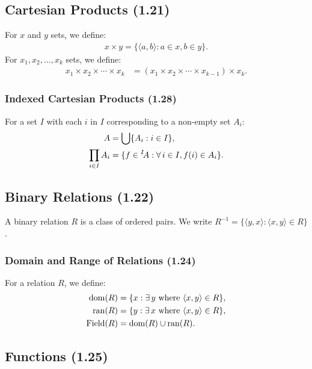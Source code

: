 \subsection{Cartesian Products (1.21)} \label{1.21}

For $x$ and $y$ sets, we define: \begin{align*}
    x \times y = \{\langle a, b \rangle : a \in x, b \in y\}.
\end{align*} For $x_1, x_2, \ldots, x_k$ sets, we define: \begin{align*}
    x_1 \times x_2 \times \cdots \times x_k 
    &= (x_1 \times x_2 \times \cdots \times x_{k - 1}) \times x_k.
\end{align*}

\subsubsection{Indexed Cartesian Products (1.28)} \label{1.28}

For a set $I$ with each $i$ in $I$ corresponding to a
non-empty set $A_i$: \begin{align*}
    A &= \bigcup \{A_i : i \in I\}, \\
    \prod_{i \in I} A_i &= \{f \in {{}^{I}}\!A : \forall \, i \in I, f(i) \in A_i \}.
\end{align*}

\subsection{Binary Relations (1.22)} \label{1.22}

A binary relation $R$ is a class of ordered pairs.
We write $R^{-1} = \{\langle y, x \rangle : \langle x, y \rangle \in R\}$.

\subsubsection{Domain and Range of Relations (1.24)} \label{1.24}

For a relation $R$, we define: \begin{align*}
    \operatorname{dom}(R) &= \{x : \exists \, y \text{ where } \langle x, y \rangle \in R\}, \\
    \operatorname{ran}(R) &= \{y : \exists \, x \text{ where } \langle x, y \rangle \in R\}, \\
    \operatorname{Field}(R) &= \operatorname{dom}(R) \cup \operatorname{ran}(R).
\end{align*}

\subsection{Functions (1.25)} \label{1.25}

